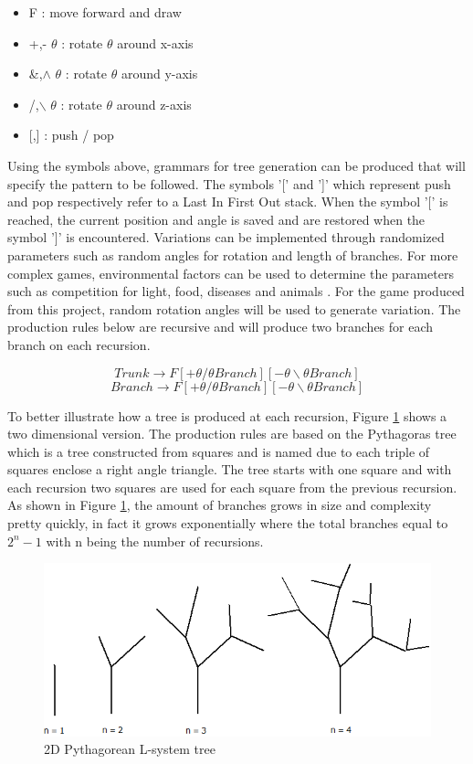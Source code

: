 \begin{itemize}
 \item F 	:	move forward and draw
 \item +,- \(\theta\)	:	rotate \(\theta\) around x-axis
 \item \&,\(\wedge\) \(\theta\)	:	rotate \(\theta\) around y-axis
 \item /,\(\backslash\) \(\theta\)	:	rotate \(\theta\) around z-axis
 \item {[,]}	:	push / pop
\end{itemize}
Using the symbols above, grammars for tree generation can be produced that will specify the pattern to be followed. The symbols '[' and ']'  which represent push and pop respectively refer to a Last In First Out stack. When the symbol '[' is reached, the current position and angle is saved and are restored when the symbol ']' is encountered. Variations can be implemented through randomized parameters such as random angles for rotation and length of branches. For more complex games, environmental factors can be used to determine the parameters such as competition for light, food, diseases and animals \cite{plantslecture}. For the game produced from this project, random rotation angles will be used to generate variation. The production rules below are recursive and will produce two branches for each branch on each recursion.


\[Trunk \rightarrow F[+\theta /\theta Branch][-\theta \backslash\theta Branch]\]
\[Branch \rightarrow F[+\theta /\theta Branch][-\theta \backslash\theta Branch]\]

To better illustrate how a tree is produced at each recursion, Figure \ref{fig:tree} shows a two dimensional version. The production rules are based on the Pythagoras tree which is a tree constructed from squares and is named due to each triple of squares enclose a right angle triangle. The tree starts with one square and with each recursion two squares are used for each square from the previous recursion. As shown in Figure \ref{fig:tree}, the amount of branches grows in size and complexity pretty quickly, in fact it grows exponentially where the total branches equal to \(2^n - 1\) with n being the number of recursions.

\begin{figure}[h!]
 \centering
 \includegraphics[width=0.9\linewidth]{images/tree.png}
 \caption{2D Pythagorean L-system tree}
 \label{fig:tree}
\end{figure}

